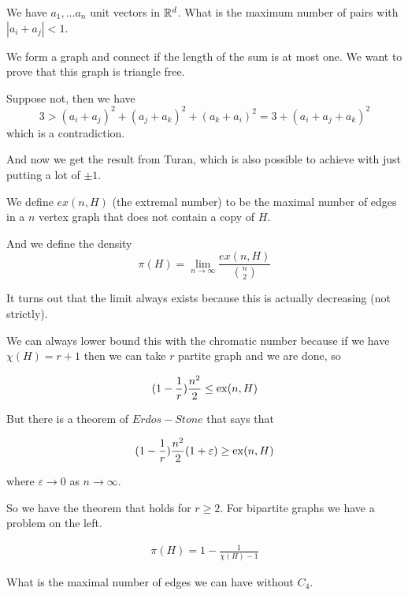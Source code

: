 \begin{primer}
    We have $a_1, \ldots a_n$ unit vectors in $\mathbb{R}^d$. What is the maximum number of pairs with $|a_i + a_j|< 1$.

\end{primer}

We form a graph and connect if the length of the sum is at most one. We want to prove that this graph is triangle free. 

Suppose not, then we have $$3>(a_i + a_j)^2 + (a_j + a_k)^2 + (a_k + a_i)^2 = 3 + (a_i + a_j + a_k)^2 $$
which is a contradiction.

And now we get the result from Turan, which is also possible to achieve with just putting a lot of $\pm 1$.

\begin{definicija}
    We define $ex(n, H)$ (the extremal number) to be the maximal number of edges in a $n$ vertex graph that does not contain a copy of $H$.

    And we define the density 
    $$\pi (H) = \lim _{n \to \infty} \frac{ex(n, H)}{\binom{n}{2}}$$
\end{definicija}

It turns out that the limit always exists because this is actually decreasing (not strictly).

We can always lower bound this with the chromatic number because if we have $\chi (H) = r+1$ then we can take $r$ partite graph and we are done, so

\begin{align*}
    (1-\frac 1r)\frac{n^2}{2} \leq \operatorname{ex}(n,H)
\end{align*}

But there is a theorem of $Erdos-Stone$ that says that

\begin{align}
     (1-\frac 1r)\frac{n^2}{2}(1+\varepsilon) \geq \operatorname{ex}(n,H)
\end{align}

where $\varepsilon \to 0$ as $n \to \infty$.

So we have the theorem that holds for $r\geq2$. For bipartite graphs we have a problem on the left.

\begin{align}
    \pi(H) = 1 - \frac{1}{\chi(H) -1}
\end{align}

\begin{primer}
    What is the maximal number of edges we can have without $C_4$.
\end{primer}